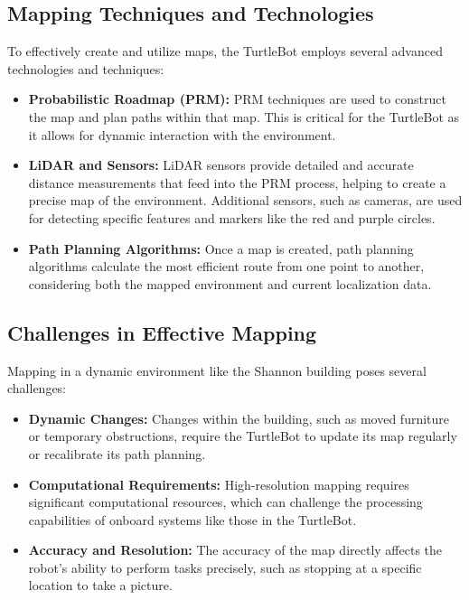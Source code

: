 \documentclass{article}
\begin{document}
	\subsection{Mapping Techniques and Technologies}
	To effectively create and utilize maps, the TurtleBot employs several advanced technologies and techniques:
	\begin{itemize}
		\item \textbf{Probabilistic Roadmap (PRM):} PRM techniques are used to construct the map and plan paths within that map. This is critical for the TurtleBot as it allows for dynamic interaction with the environment.
		\item \textbf{LiDAR and Sensors:} LiDAR sensors provide detailed and accurate distance measurements that feed into the PRM process, helping to create a precise map of the environment. Additional sensors, such as cameras, are used for detecting specific features and markers like the red and purple circles.
		\item \textbf{Path Planning Algorithms:} Once a map is created, path planning algorithms calculate the most efficient route from one point to another, considering both the mapped environment and current localization data.
	\end{itemize}
	
	\subsection{Challenges in Effective Mapping}
	Mapping in a dynamic environment like the Shannon building poses several challenges:
	\begin{itemize}
		\item \textbf{Dynamic Changes:} Changes within the building, such as moved furniture or temporary obstructions, require the TurtleBot to update its map regularly or recalibrate its path planning.
		\item \textbf{Computational Requirements:} High-resolution mapping requires significant computational resources, which can challenge the processing capabilities of onboard systems like those in the TurtleBot.
		\item \textbf{Accuracy and Resolution:} The accuracy of the map directly affects the robot's ability to perform tasks precisely, such as stopping at a specific location to take a picture.
	\end{itemize}
	
\end{document}

